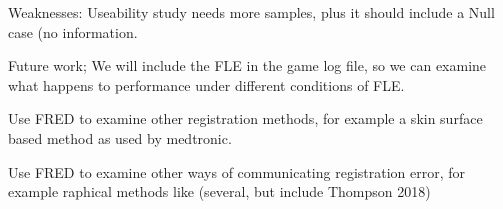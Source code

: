 Weaknesses:
Useability study needs more samples, plus it should include a Null case (no information.

Future work;
We will include the FLE in the game log file, so we can examine what happens to performance under different conditions of FLE.

Use FRED to examine other registration methods, for example a skin surface based method as used by medtronic.

Use FRED to examine other ways of communicating registration error, for example raphical methods like (several, but include Thompson 2018)
